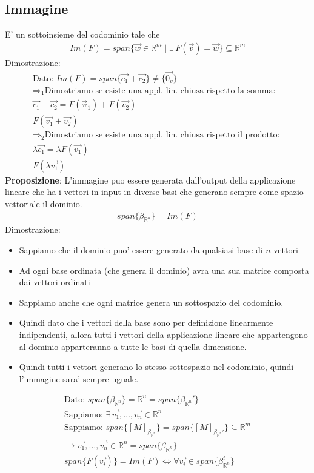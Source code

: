 \documentclass[10pt]{extarticle}
\begin{document}
\subsection{Immagine}
E' un sottoinsieme del codominio tale che
\begin{align*}
    Im(F)=span\{\vec{w}\in\mathbb{R}^m \mid \exists \, F(\vec{v})=\vec{w}\} \subseteq \mathbb{R}^m
\end{align*}
Dimostrazione:
\begin{align*}
    \text{Dato: } Im(F)=span\{\vec{c_1}+\vec{c_2}\}\neq\{\vec{0_v}\} \\
    \Rightarrow_1 \text{Dimostriamo se esiste una appl. lin. chiusa rispetto la somma: } \\
    \vec{c_1}+\vec{c_2}=F(\vec{v}_1)+F(\vec{v_2}) \\
    F(\vec{v_1}+\vec{v_2}) \\
    \Rightarrow_2 \text{Dimostriamo se esiste una appl. lin. chiusa rispetto il prodotto: } \\
    \lambda\vec{c_1}=\lambda F(\vec{v_1}) \\
    F(\lambda\vec{v_1})
\end{align*}
\textbf{Proposizione}: L'immagine puo essere generata dall'output della applicazione lineare che ha i vettori in input in diverse basi che generano sempre come spazio vettoriale il dominio.
\begin{align*}
    span\{\beta_{\mathbb{R}^n}\}=Im(F)
\end{align*}
Dimostrazione:
\begin{itemize}
    \item Sappiamo che il dominio puo' essere generato da qualsiasi base di $n$-vettori
    \item Ad ogni base ordinata (che genera il dominio) avra una sua matrice composta dai vettori ordinati
    \item Sappiamo anche che ogni matrice genera un sottospazio del codominio.
    \item Quindi dato che i vettori della base sono per definizione linearmente indipendenti, allora tutti i vettori della applicazione lineare che appartengono al dominio apparteranno a tutte le basi di quella dimensione.
    \item Quindi tutti i vettori generano lo stesso sottospazio nel codominio, quindi l'immagine sara' sempre uguale.
\end{itemize}
\begin{align*}
    \text{Dato: } span\{\beta_{\mathbb{R}^n}\}=\mathbb{R}^n=span\{\beta_{\mathbb{R}^n}'\} \\
    \text{Sappiamo: } \exists \, \vec{v_1},\dots,\vec{v_n}\in\mathbb{R}^n \\
    \text{Sappiamo: } span\{[M]_{\beta_{\mathbb{R}^n}}\}=span\{[M]_{\beta_{\mathbb{R}^n}'}\}\subseteq \mathbb{R}^m \\
    \to \vec{v_1},\dots,\vec{v_n}\in \mathbb{R}^n=span\{\beta_{\mathbb{R}^n}\}\\
    span\{F(\vec{v_i})\}=Im(F) \iff \forall\vec{v_i} \in span\{\beta_{\mathbb{R}^n}^i\} 
\end{align*}
\vspace{1em}\\
\end{document}
